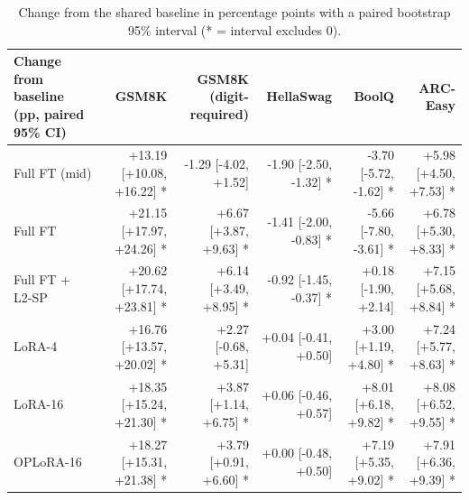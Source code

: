 \begin{table}[t]
\centering\small
\begin{tabular}{lrrrrr}
\toprule
Change from baseline (pp, paired 95\% CI) & GSM8K & GSM8K (digit-required) & HellaSwag & BoolQ & ARC-Easy \\
\midrule
Full FT (mid) & +13.19 [+10.08, +16.22] * & -1.29 [-4.02, +1.52] & -1.90 [-2.50, -1.32] * & -3.70 [-5.72, -1.62] * & +5.98 [+4.50, +7.53] * \\
Full FT & +21.15 [+17.97, +24.26] * & +6.67 [+3.87, +9.63] * & -1.41 [-2.00, -0.83] * & -5.66 [-7.80, -3.61] * & +6.78 [+5.30, +8.33] * \\
Full FT + L2-SP & +20.62 [+17.74, +23.81] * & +6.14 [+3.49, +8.95] * & -0.92 [-1.45, -0.37] * & +0.18 [-1.90, +2.14] & +7.15 [+5.68, +8.84] * \\
LoRA-4 & +16.76 [+13.57, +20.02] * & +2.27 [-0.68, +5.31] & +0.04 [-0.41, +0.50] & +3.00 [+1.19, +4.80] * & +7.24 [+5.77, +8.63] * \\
LoRA-16 & +18.35 [+15.24, +21.30] * & +3.87 [+1.14, +6.75] * & +0.06 [-0.46, +0.57] & +8.01 [+6.18, +9.82] * & +8.08 [+6.52, +9.55] * \\
OPLoRA-16 & +18.27 [+15.31, +21.38] * & +3.79 [+0.91, +6.60] * & +0.00 [-0.48, +0.50] & +7.19 [+5.35, +9.02] * & +7.91 [+6.36, +9.39] * \\
\bottomrule
\end{tabular}
\caption{Change from the shared baseline in percentage points with a paired bootstrap 95\% interval (* = interval excludes 0).}
\label{tab:task1_vs_baseline}
\end{table}
